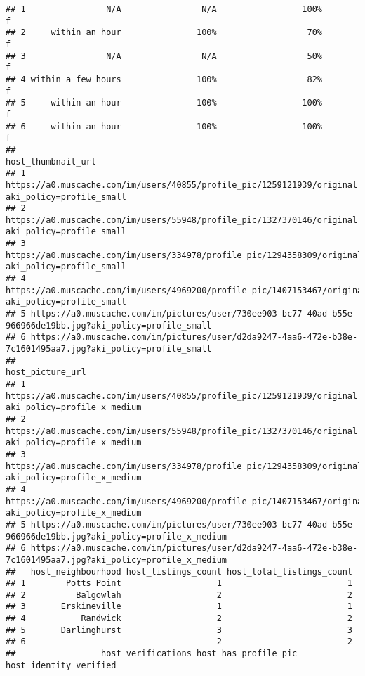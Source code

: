\documentclass[
]{article}
\begin{document}
\begin{verbatim}
## 1                N/A                N/A                 100%                 f
## 2     within an hour               100%                  70%                 f
## 3                N/A                N/A                  50%                 f
## 4 within a few hours               100%                  82%                 f
## 5     within an hour               100%                 100%                 f
## 6     within an hour               100%                 100%                 f
##                                                                                           host_thumbnail_url
## 1        https://a0.muscache.com/im/users/40855/profile_pic/1259121939/original.jpg?aki_policy=profile_small
## 2        https://a0.muscache.com/im/users/55948/profile_pic/1327370146/original.jpg?aki_policy=profile_small
## 3       https://a0.muscache.com/im/users/334978/profile_pic/1294358309/original.jpg?aki_policy=profile_small
## 4      https://a0.muscache.com/im/users/4969200/profile_pic/1407153467/original.jpg?aki_policy=profile_small
## 5 https://a0.muscache.com/im/pictures/user/730ee903-bc77-40ad-b55e-966966de19bb.jpg?aki_policy=profile_small
## 6 https://a0.muscache.com/im/pictures/user/d2da9247-4aa6-472e-b38e-7c1601495aa7.jpg?aki_policy=profile_small
##                                                                                                host_picture_url
## 1        https://a0.muscache.com/im/users/40855/profile_pic/1259121939/original.jpg?aki_policy=profile_x_medium
## 2        https://a0.muscache.com/im/users/55948/profile_pic/1327370146/original.jpg?aki_policy=profile_x_medium
## 3       https://a0.muscache.com/im/users/334978/profile_pic/1294358309/original.jpg?aki_policy=profile_x_medium
## 4      https://a0.muscache.com/im/users/4969200/profile_pic/1407153467/original.jpg?aki_policy=profile_x_medium
## 5 https://a0.muscache.com/im/pictures/user/730ee903-bc77-40ad-b55e-966966de19bb.jpg?aki_policy=profile_x_medium
## 6 https://a0.muscache.com/im/pictures/user/d2da9247-4aa6-472e-b38e-7c1601495aa7.jpg?aki_policy=profile_x_medium
##   host_neighbourhood host_listings_count host_total_listings_count
## 1        Potts Point                   1                         1
## 2          Balgowlah                   2                         2
## 3       Erskineville                   1                         1
## 4           Randwick                   2                         2
## 5       Darlinghurst                   3                         3
## 6                                      2                         2
##                 host_verifications host_has_profile_pic host_identity_verified

\end{verbatim}
\end{document}
